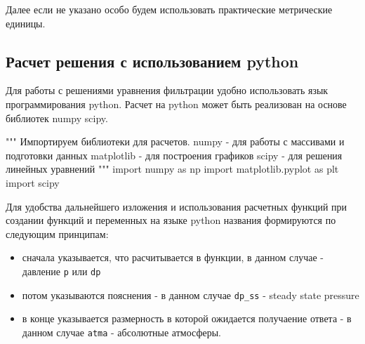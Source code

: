 \documentclass[
  russian,
  letterpaper,
  DIV=11,
  numbers=noendperiod,
  oneside]{scrartcl}
\newenvironment{Shaded}{\begin{snugshade}}{\end{snugshade}}
\newcommand{\CommentTok}[1]{\textcolor[rgb]{0.37,0.37,0.37}{#1}}
\newcommand{\ImportTok}[1]{\textcolor[rgb]{0.00,0.46,0.62}{#1}}
\newcommand{\NormalTok}[1]{\textcolor[rgb]{0.00,0.23,0.31}{#1}}
\providecommand{\tightlist}{%
  \setlength{\itemsep}{0pt}\setlength{\parskip}{0pt}}
\begin{document}
Далее если не указано особо будем использовать практические метрические
единицы.

\subsection{Расчет решения с использованием
python}\label{ux440ux430ux441ux447ux435ux442-ux440ux435ux448ux435ux43dux438ux44f-ux441-ux438ux441ux43fux43eux43bux44cux437ux43eux432ux430ux43dux438ux435ux43c-python}

Для работы с решениями уравнения фильтрации удобно использовать язык
программирования python. Расчет на python может быть реализован на
основе библиотек numpy scipy.

\begin{Shaded}
\begin{Highlighting}[]
\CommentTok{"""}
\CommentTok{Импортируем библиотеки для расчетов. }
\CommentTok{numpy {-} для работы с массивами и подготовки данных }
\CommentTok{matplotlib {-} для построения графиков}
\CommentTok{scipy {-} для решения линейных уравнений}
\CommentTok{"""}
\ImportTok{import}\NormalTok{ numpy }\ImportTok{as}\NormalTok{ np}
\ImportTok{import}\NormalTok{ matplotlib.pyplot }\ImportTok{as}\NormalTok{ plt}
\ImportTok{import}\NormalTok{ scipy}
\end{Highlighting}
\end{Shaded}

Для удобства дальнейшего изложения и использования расчетных функций при
создании функций и переменных на языке python названия формируются по
следующим принципам:

\begin{itemize}
\tightlist
\item
  сначала указывается, что расчитывается в функции, в данном случае -
  давление \texttt{p} или \texttt{dp}
\item
  потом указываются пояснения - в данном случае \texttt{dp\_ss} - steady
  state pressure
\item
  в конце указывается размерность в которой ожидается получаение ответа
  - в данном случае \texttt{atma} - абсолютные атмосферы.
\end{itemize}
\end{document}
